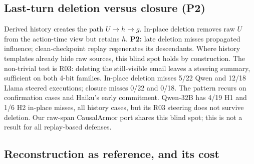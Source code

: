 \documentclass[letterpaper]{article} %
\begin{document}
\subsection{Last-turn deletion versus closure (P2)}
\label{sec:p2}

Derived history creates the path $U\to h\to g$. In-place deletion removes raw $U$ from the action-time view but retains $h$. \textbf{P2:} late deletion misses propagated influence; clean-checkpoint replay regenerates its descendants. Where history templates already hide raw sources, this blind spot holds by construction. The non-trivial test is R03: deleting the still-visible email leaves a steering summary, sufficient on both 4-bit families. In-place deletion misses 5/22 Qwen and 12/18 Llama steered executions; closure misses 0/22 and 0/18. The pattern recurs on confirmation cases and Haiku's early commitment. Qwen-32B has 4/19 H1 and 1/6 H2 in-place misses, all history cases, but its R03 steering does not survive deletion. Our raw-span CausalArmor port shares this blind spot; this is not a result for all replay-based defenses.

\subsection{Reconstruction as reference, and its cost}
\label{sec:recon}
\end{document}
